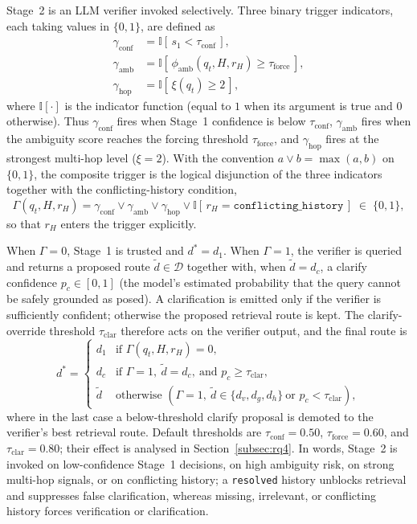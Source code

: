 Stage~2 is an LLM verifier invoked selectively. Three binary trigger
indicators, each taking values in $\{0,1\}$, are defined as
\begin{align}
\gamma_{\mathrm{conf}} &= \mathbb{I}[\,s_1 < \tau_{\mathrm{conf}}\,],
    \label{eq:gamma_conf}\\
\gamma_{\mathrm{amb}}  &= \mathbb{I}[\,\phi_{\mathrm{amb}}(q_t,H,r_H) \geq \tau_{\mathrm{force}}\,],
    \label{eq:gamma_amb}\\
\gamma_{\mathrm{hop}}  &= \mathbb{I}[\,\xi(q_t) \geq 2\,],
    \label{eq:gamma_hop}
\end{align}
where $\mathbb{I}[\cdot]$ is the indicator function (equal to $1$ when its
argument is true and $0$ otherwise). Thus $\gamma_{\mathrm{conf}}$ fires when
Stage~1 confidence is below $\tau_{\mathrm{conf}}$, $\gamma_{\mathrm{amb}}$
fires when the ambiguity score reaches the forcing threshold
$\tau_{\mathrm{force}}$, and $\gamma_{\mathrm{hop}}$ fires at the strongest
multi-hop level ($\xi=2$). With the convention $a\vee b=\max(a,b)$ on
$\{0,1\}$, the composite trigger is the logical disjunction of the three
indicators together with the conflicting-history condition,
\begin{equation}
\Gamma(q_t,H,r_H) = \gamma_{\mathrm{conf}}\vee\gamma_{\mathrm{amb}}\vee\gamma_{\mathrm{hop}}\vee\mathbb{I}[\,r_H=\texttt{conflicting\_history}\,]\;\in\;\{0,1\},
\label{eq:trigger_function}
\end{equation}
so that $r_H$ enters the trigger explicitly.

When $\Gamma=0$, Stage~1 is trusted and $d^*=d_1$. When $\Gamma=1$, the
verifier is queried and returns a proposed route $\tilde{d}\in\mathcal{D}$
together with, when $\tilde{d}=d_c$, a clarify confidence
$p_c\in[0,1]$ (the model's estimated probability that the query cannot be
safely grounded as posed). A clarification is emitted only if the verifier is
sufficiently confident; otherwise the proposed retrieval route is kept. The
clarify-override threshold $\tau_{\mathrm{clar}}$ therefore acts on the
verifier output, and the final route is
\begin{equation}
d^* =
\begin{cases}
d_1 & \text{if } \Gamma(q_t,H,r_H)=0,\\[3pt]
d_c & \text{if } \Gamma=1,\ \tilde{d}=d_c,\ \text{and } p_c\ge\tau_{\mathrm{clar}},\\[3pt]
\tilde{d} & \text{otherwise } (\Gamma=1,\ \tilde{d}\in\{d_v,d_g,d_h\}\ \text{or } p_c<\tau_{\mathrm{clar}}),
\end{cases}
\label{eq:final_route}
\end{equation}
where in the last case a below-threshold clarify proposal is demoted to the
verifier's best retrieval route. Default thresholds are
$\tau_{\mathrm{conf}}=0.50$, $\tau_{\mathrm{force}}=0.60$, and
$\tau_{\mathrm{clar}}=0.80$; their effect is analysed in
Section~\ref{subsec:rq4}. In words, Stage~2 is invoked on low-confidence
Stage~1 decisions, on high ambiguity risk, on strong multi-hop signals, or on
conflicting history; a \texttt{resolved} history unblocks retrieval and
suppresses false clarification, whereas missing, irrelevant, or conflicting
history forces verification or clarification.

